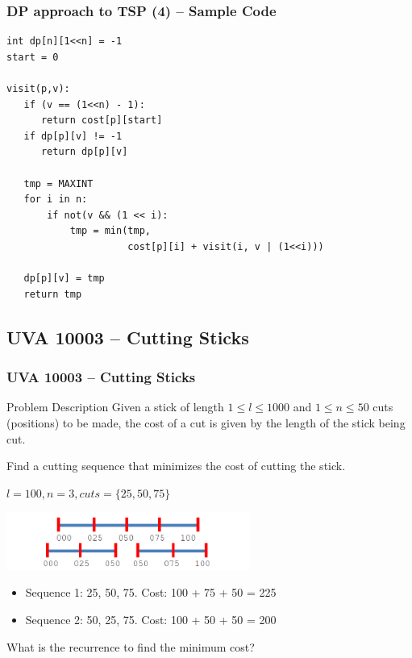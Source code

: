 \documentclass{beamer}
\begin{document}
\begin{frame}[fragile]
  \frametitle{DP approach to TSP (4) -- Sample Code}

{\smaller
  \begin{exampleblock}{}
\begin{verbatim}
int dp[n][1<<n] = -1
start = 0

visit(p,v):
   if (v == (1<<n) - 1):
      return cost[p][start]
   if dp[p][v] != -1
      return dp[p][v]

   tmp = MAXINT
   for i in n:
       if not(v && (1 << i):
           tmp = min(tmp,
                     cost[p][i] + visit(i, v | (1<<i)))

   dp[p][v] = tmp
   return tmp
\end{verbatim}
  \end{exampleblock}}
\end{frame}


\subsection{UVA 10003 -- Cutting Sticks}
\begin{frame}
  \frametitle{UVA 10003 -- Cutting Sticks}
  
  {\smaller
  \begin{block}{Problem Description}
    Given a stick of length $1 \leq l \leq 1000$ and $1 \leq n \leq
    50$ cuts (positions) to be made, the cost of a cut is given by the length of 
    the stick being cut.

    \medskip

    Find a cutting sequence that minimizes the cost of cutting the stick.
  \end{block}
  
  \medskip

   $l=100, n=3, cuts=\{25,50,75\}$

  \begin{center}
    \includegraphics[width=0.6\textwidth]{../img/cuttingsticks}
  \end{center}

  \begin{itemize}
  \item Sequence 1: 25, 50, 75. Cost: 100 + 75 + 50 = 225
  \item Sequence 2: 50, 25, 75. Cost: 100 + 50 + 50 = 200
  \end{itemize}

  \begin{block}{}
  What is the recurrence to find the minimum cost?
  \end{block}
  }
\end{frame}
\end{document}
